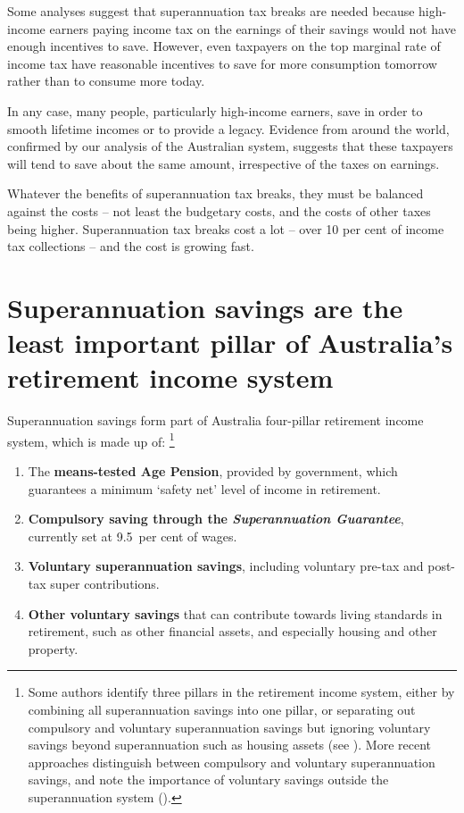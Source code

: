 Some analyses suggest that superannuation tax breaks are needed because high-income earners paying income tax on the earnings of their savings would not have enough incentives to save. However, even taxpayers on the top marginal rate of income tax have reasonable incentives to save for more consumption tomorrow rather than to consume more  today.

In any case, many people, particularly high-income earners, save in order to smooth lifetime incomes or to provide a legacy. Evidence from around the world, confirmed by our analysis of the Australian system, suggests that these taxpayers will tend to save about the same amount, irrespective of the taxes on earnings.

\oneraggedpage

Whatever the benefits of superannuation tax breaks, they must be balanced against the costs – not least the budgetary costs, and the costs of other taxes being higher. Superannuation tax breaks cost a lot – over 10 per cent of income tax collections – and the cost is growing fast.

\section{Superannuation savings are the least important pillar of Australia's retirement income system}\label{sec:SUPER-Super-savings-are-least-important-pillar}\label{sec:SUPER-2-1}
Superannuation savings form part of Australia four-pillar retirement income system, which is made up of:%
\footnote{%
Some authors identify three pillars in the retirement income system, either by combining all superannuation savings into one pillar, or separating out compulsory and voluntary superannuation savings but ignoring voluntary savings beyond superannuation such as housing assets (see \textcite[][9]{Treasury2009aftsRetirementIncomeStrategicIssues}). More recent approaches distinguish between compulsory and voluntary superannuation savings, and note the importance of voluntary savings outside the superannuation system (\textcite[][17]{Derby2015}). 
}%
\mynobreakpar
\begin{enumerate}
\item The \textbf{means-tested Age Pension}, provided by government, which guarantees a minimum `safety net' level of income in retirement.
\item \textbf{Compulsory saving through the \emph{Superannuation Guarantee}}, currently set at 9.5~per cent of wages.
\item \textbf{Voluntary superannuation savings}, including voluntary pre-tax and post-tax super contributions.
\item \textbf{Other voluntary savings} that can contribute towards living standards in retirement, such as other financial assets, and especially housing and other property.
\end{enumerate}

